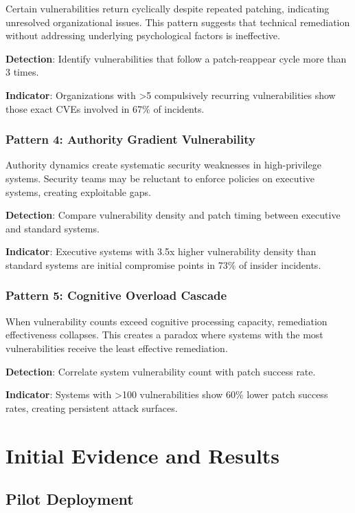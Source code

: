 \documentclass[11pt,a4paper]{article}
\begin{document}
Certain vulnerabilities return cyclically despite repeated patching, indicating unresolved organizational issues. This pattern suggests that technical remediation without addressing underlying psychological factors is ineffective.

\textbf{Detection}: Identify vulnerabilities that follow a patch-reappear cycle more than 3 times.

\textbf{Indicator}: Organizations with >5 compulsively recurring vulnerabilities show those exact CVEs involved in 67\% of incidents.

\subsubsection{Pattern 4: Authority Gradient Vulnerability}

Authority dynamics create systematic security weaknesses in high-privilege systems. Security teams may be reluctant to enforce policies on executive systems, creating exploitable gaps.

\textbf{Detection}: Compare vulnerability density and patch timing between executive and standard systems.

\textbf{Indicator}: Executive systems with 3.5x higher vulnerability density than standard systems are initial compromise points in 73\% of insider incidents.

\subsubsection{Pattern 5: Cognitive Overload Cascade}

When vulnerability counts exceed cognitive processing capacity, remediation effectiveness collapses. This creates a paradox where systems with the most vulnerabilities receive the least effective remediation.

\textbf{Detection}: Correlate system vulnerability count with patch success rate.

\textbf{Indicator}: Systems with >100 vulnerabilities show 60\% lower patch success rates, creating persistent attack surfaces.

\section{Initial Evidence and Results}

\subsection{Pilot Deployment}
\end{document}
